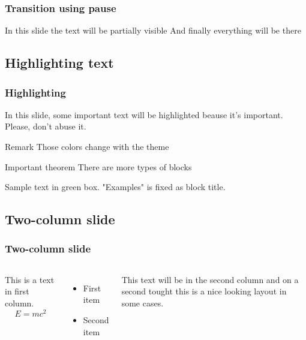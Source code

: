 \documentclass[12pt]{beamer}
\begin{document}
\begin{frame}
\frametitle{Transition using pause}
 In this slide \pause
 the text will be partially visible \pause
 And finally everything will be there
\end{frame}


\subsection{Highlighting text}
\begin{frame}
\frametitle{Highlighting}
 
In this slide, some important text will be
\alert{highlighted} beause it's important.
Please, don't abuse it.
 
\begin{block}{Remark}
Those colors change with the theme
\end{block}
 
\begin{alertblock}{Important theorem}
There are more types of blocks
\end{alertblock}
 
\begin{example}
Sample text in green box. "Examples" is fixed as block title.
\end{example}
\end{frame}


\subsection{Two-column slide}
\begin{frame}
\frametitle{Two-column slide}
 
\begin{columns}
 
This is a text in first column.
$$E=mc^2$$
\begin{itemize}
\item First item
\item Second item
\end{itemize}
 
This text will be in the second column
and on a second tought this is a nice looking
layout in some cases.
\end{columns}
\end{frame}
\end{document}
